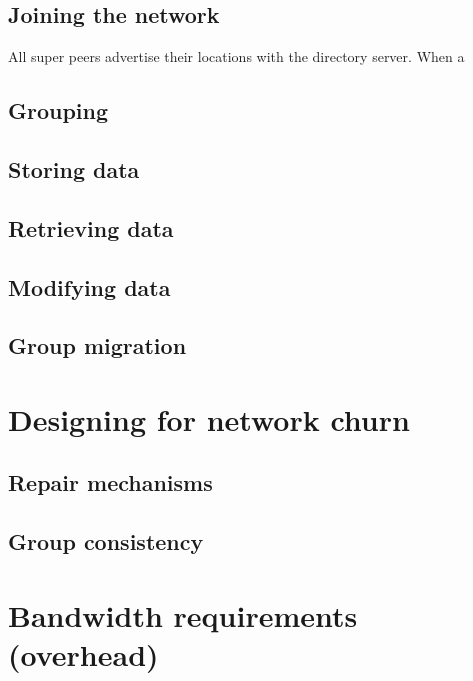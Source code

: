     \subsection{Joining the network}
    \label{network_join_iplementation}
    All super peers advertise their locations with the directory server. When a

    \subsection{Grouping}

    \subsection{Storing data}

    \subsection{Retrieving data}

    \subsection{Modifying data}

    \subsection{Group migration}

\section{Designing for network churn}

    \subsection{Repair mechanisms}

    \subsection{Group consistency}

\section{Bandwidth requirements (overhead)}
